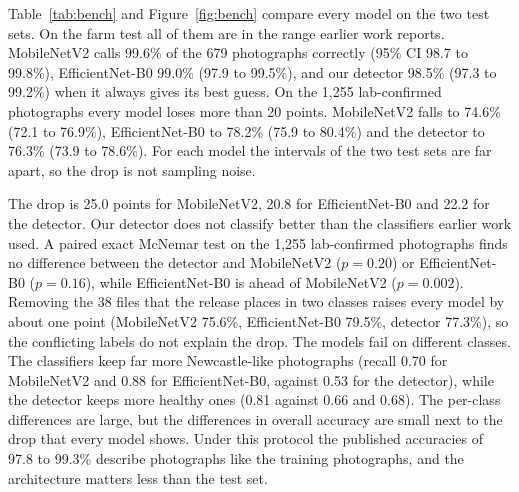 \documentclass[10pt,twocolumn]{article}
\begin{document}
Table~\ref{tab:bench} and Figure~\ref{fig:bench} compare every model on the two test sets. On the farm test all of
them are in the range earlier work reports. MobileNetV2 calls 99.6\% of the 679 photographs correctly (95\% CI 98.7 to
99.8\%), EfficientNet-B0 99.0\% (97.9 to 99.5\%), and our detector 98.5\% (97.3 to 99.2\%) when it always gives its
best guess. On the 1,255 lab-confirmed photographs every model loses more than 20 points. MobileNetV2 falls to 74.6\%
(72.1 to 76.9\%), EfficientNet-B0 to 78.2\% (75.9 to 80.4\%) and the detector to 76.3\% (73.9 to 78.6\%). For each
model the intervals of the two test sets are far apart, so the drop is not sampling noise.

The drop is 25.0 points for MobileNetV2, 20.8 for EfficientNet-B0 and 22.2 for the detector. Our detector does not
classify better than the classifiers earlier work used. A paired exact McNemar test on the 1,255 lab-confirmed
photographs finds no difference between the detector and MobileNetV2 ($p=0.20$) or EfficientNet-B0 ($p=0.16$), while
EfficientNet-B0 is ahead of MobileNetV2 ($p=0.002$). Removing the 38 files that the release places in two classes
raises every model by about one point (MobileNetV2 75.6\%, EfficientNet-B0 79.5\%, detector 77.3\%), so the conflicting
labels do not explain the drop. The models fail on different classes. The classifiers keep far more Newcastle-like photographs (recall 0.70 for MobileNetV2 and 0.88 for
EfficientNet-B0, against 0.53 for the detector), while the detector keeps more healthy ones (0.81 against 0.66 and
0.68). The per-class differences are large, but the differences in overall accuracy are small next to the drop
that every model shows. Under this protocol the published
accuracies of 97.8 to 99.3\% describe photographs like the training photographs, and the architecture matters less than the test set.

\begin{table}[t]
\centering
\caption{Accuracy and macro-F1 on the held-out farm test (679 photographs) and the lab-confirmed photographs (1,255),
for models trained on the same 5,451 photographs. One training run per model. The detector is scored with its best class in each photograph (always answers) and with the deployed 0.25
confidence threshold (below it the photograph counts as wrong). Bold marks the best value in each column.}
\label{tab:bench}
\small
{}
\end{table}
\end{document}
